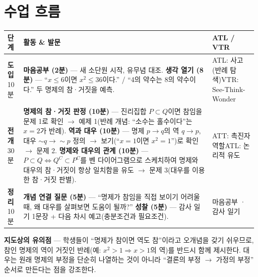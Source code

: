 \documentclass[11pt,a4paper]{article}
\begin{document}
\section{수업 흐름}
\begin{tabularx}{\linewidth}{@{}>{\centering\arraybackslash}p{1.6cm}X>{\raggedright\arraybackslash\small}p{3.1cm}@{}}
\toprule
\textbf{단계} & \textbf{활동 \& 발문} & \textbf{ATL / VTR} \\
\midrule
\textcolor{goldstrong}{\textbf{도입}}\newline\footnotesize 10분 &
\textbf{마음공부 (2분)} --- 새 소단원 시작, 유무념 대조.\newline
\textbf{생각 열기 (8분)} --- ``$x\le6$이면 $x^2\le36$이다.'' / ``4의 약수는 8의 약수이다.'' 두 명제의 참·거짓을 예측. &
ATL: 사고(반례 탐색)\newline VTR: See-Think-Wonder \\
\addlinespace
\textcolor{goldstrong}{\textbf{전개}}\newline\footnotesize 30분 &
\textbf{명제의 참·거짓 판정 (10분)} --- 진리집합 $P\subset Q$이면 참임을 문제 1로 확인 $\to$ 예제 1(반례 개념: ``소수는 홀수이다''는 $x=2$가 반례).\newline
\textbf{역과 대우 (10분)} --- 명제 $p\to q$의 역 $q\to p$, 대우 $\sim q\to\sim p$ 정의 $\to$ 보기(``$x=1$이면 $x^2=1$'')로 확인 $\to$ 문제 2.\newline
\textbf{명제와 대우의 관계 (10분)} --- $P\subset Q \iff Q^C\subset P^C$를 벤 다이어그램으로 스케치하여 명제와 대우의 참·거짓이 항상 일치함을 유도 $\to$ 문제 3(대우를 이용한 참·거짓 판별). &
ATT: 촉진자 역할\newline ATL: 논리적 유도 \\
\addlinespace
\textcolor{goldstrong}{\textbf{정리}}\newline\footnotesize 10분 &
\textbf{개념 연결 질문 (5분)} --- ``명제가 참임을 직접 보이기 어려울 때, 왜 대우를 살펴보면 도움이 될까?''\newline
\textbf{성찰 (5분)} --- 감사 일기 1문장 + 다음 차시 예고(충분조건과 필요조건). &
마음공부 · 감사 일기 \\
\bottomrule
\end{tabularx}

\begin{calloutbox}
\textbf{지도상의 유의점} --- 학생들이 ``명제가 참이면 역도 참''이라고 오개념을 갖기 쉬우므로, 참인 명제의 역이 거짓인 반례(예: $x^2>1 \Rightarrow x>1$의 역)를 반드시 함께 제시한다. 대우는 원래 명제의 부정을 단순히 나열하는 것이 아니라 ``결론의 부정 $\to$ 가정의 부정'' 순서로 만든다는 점을 강조한다.
\end{calloutbox}
\end{document}
